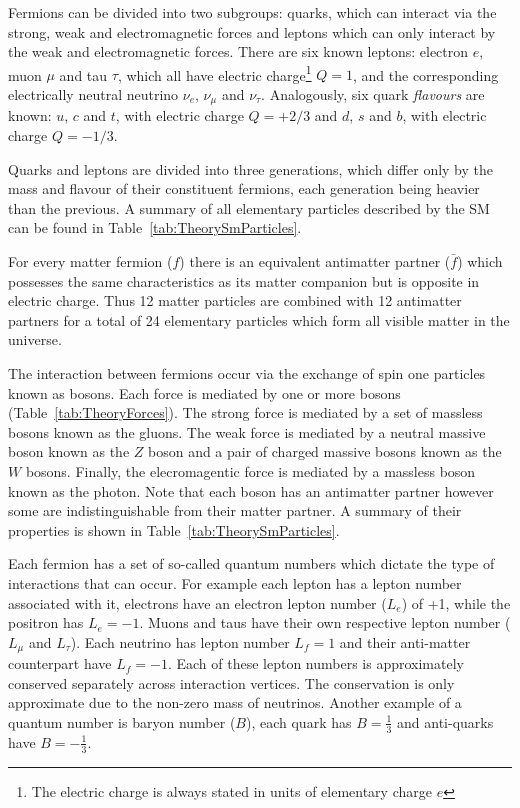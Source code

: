 Fermions can be divided into two subgroups: quarks, which can interact via the strong, weak and electromagnetic forces and leptons which can only interact by the weak and electromagnetic forces. There are six known leptons: electron $e$, muon $\mu$ and tau $\tau$, which all have electric charge\footnote{The electric charge is always stated in units of elementary charge $e$} $Q=1$, and the corresponding electrically neutral neutrino $\nu_e$, $\nu_\mu$ and $\nu_{\tau}$. Analogously, six quark \textit{flavours} are known: $u$, $c$ and $t$, with electric charge $Q=+2/3$ and $d$, $s$ and $b$, with electric charge $Q=-1/3$.

Quarks and leptons are divided into three generations, which differ only by the mass and flavour of their constituent fermions, each generation being heavier than the previous. A summary of all elementary particles described by the SM can be found in Table~\ref{tab:TheorySmParticles}.

For every matter fermion ($f$) there is an equivalent antimatter partner ($\bar{f}$) which possesses the same characteristics as its matter companion but is opposite in electric charge. Thus 12 matter particles are combined with 12 antimatter partners for a total of 24 elementary particles which form all visible matter in the universe.

The interaction between fermions occur via the exchange of spin one particles known as bosons. Each force is mediated by one or more bosons (Table~\ref{tab:TheoryForces}). The strong force is mediated by a set of massless bosons known as the gluons. The weak force is mediated by a neutral massive boson known as the $Z$ boson and a pair of charged massive bosons known as the $W$ bosons. Finally, the elecromagentic force is mediated by a massless boson known as the photon. Note that each boson has an antimatter partner however some are indistinguishable from their matter partner. A summary of their properties is shown in Table~\ref{tab:TheorySmParticles}.

Each fermion has a set of so-called quantum numbers which dictate the type of interactions that can occur. For example each lepton has a lepton number associated with it, electrons have an electron lepton number ($L_e$) of +1, while the positron has $L_e=-1$. Muons and taus have their own respective lepton number ($L_{\mu}$ and $L_{\tau}$). Each neutrino has lepton number $L_{f}=1$ and their anti-matter counterpart have $L_f=-1$. Each of these lepton numbers is approximately conserved separately across interaction vertices. The conservation is only approximate due to the non-zero mass of neutrinos. Another example of a quantum number is baryon number ($B$), each quark has $B=\frac{1}{3}$ and anti-quarks have $B=-\frac{1}{3}$.

